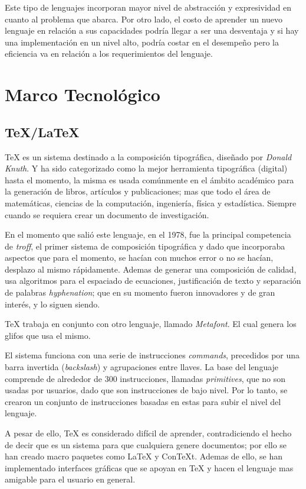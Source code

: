 \documentclass[12pt,letterpaper,titlepage,oneside,openright]{book}
\newcommand{\latex}{\LaTeX\xspace}
\newcommand{\tex}{\TeX\xspace}
\begin{document}
Este tipo de lenguajes incorporan mayor nivel de abstracción y expresividad en cuanto al problema que abarca. Por otro lado, el costo de aprender un nuevo lenguaje en relación a sus capacidades podría llegar a ser una desventaja y si hay una implementación en un nivel alto, podría costar en el desempeño pero la eficiencia va en relación a los requerimientos del lenguaje.

\chapter{Marco Tecnológico}

\section{\tex/\latex}

\tex es un sistema destinado a la composición tipográfica, diseñado por \textit{Donald Knuth}. Y ha sido categorizado como la mejor herramienta tipográfica (digital) hasta el momento, la misma es usada comúnmente en el ámbito académico para la generación de libros, artículos y publicaciones; mas que todo el área de matemáticas, ciencias de la computación, ingeniería, física y estadística. Siempre cuando se requiera crear un documento de investigación.

En el momento que salió este lenguaje, en el 1978, fue la principal competencia de \textit{troff}, el primer sistema de composición tipográfica y dado que incorporaba aspectos que para el momento, se hacían con muchos error o no se hacían, desplazo al mismo rápidamente. Ademas de generar una composición de calidad, usa algoritmos para el espaciado de ecuaciones, justificación de texto y separación de palabras \textit{hyphenation}; que en su momento fueron innovadores y de gran interés, y lo siguen siendo.

\tex trabaja en conjunto con otro lenguaje, llamado \textit{Metafont}. El cual genera los glifos que usa el mismo.

El sistema funciona con una serie de instrucciones \textit{commands}, precedidos por una barra invertida (\textit{backslash}) y agrupaciones entre llaves. La base del lenguaje comprende de alrededor de 300 instrucciones, llamadas \textit{primitives}, que no son usadas por usuarios, dado que son instrucciones de bajo nivel. Por lo tanto, se crearon un conjunto de instrucciones basadas en estas para subir el nivel del lenguaje.

A pesar de ello, \tex es considerado difícil de aprender, contradiciendo el hecho de decir que es un sistema para que cualquiera genere documentos; por ello se han creado macro paquetes como \latex y Con\TeX t. Ademas de ello, se han implementado interfaces gráficas que se apoyan en \tex y hacen el lenguaje mas amigable para el usuario en general.
\end{document}
